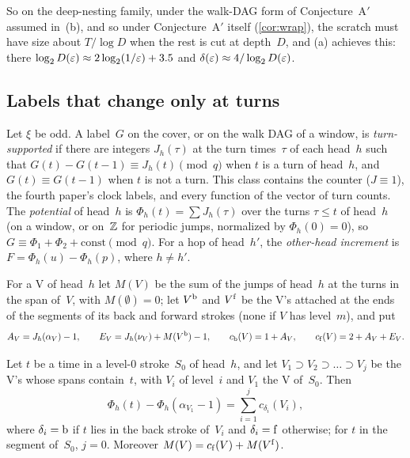 So on the deep-nesting family, under the walk-DAG form of Conjecture~A$'$ assumed in~(b), and so under Conjecture~A$'$
itself (\cref{cor:wrap}), the scratch must have size about
$T/\log D$ when the rest is cut at depth~$D$, and (a) achieves this: there $\log_2D(\varepsilon)\approx2\log_2(1/\varepsilon)+3.5$ and $\delta(\varepsilon)\approx4/\log_2D(\varepsilon)$.

\subsection{Labels that change only at turns}\label{sec:dnp-turnlabels}

Let $\xi$ be odd. A label~$G$ on the cover, or on the walk DAG of a window, is \emph{turn-supported} if there are integers
$J_h(\tau)$ at the turn times~$\tau$ of each head~$h$ such that $G(t)-G(t-1)\equiv J_h(t)\pmod q$ when $t$ is a turn of
head~$h$, and $G(t)\equiv G(t-1)$ when $t$ is not a turn. This class contains the counter ($J\equiv1$), the fourth paper's
clock labels, and every function of the vector of turn counts. The \emph{potential} of head~$h$ is
$\Phi_h(t)=\sum J_h(\tau)$ over the turns $\tau\le t$ of head~$h$ (on a window, or on~$\mathbb{Z}$ for periodic jumps, normalized
by $\Phi_h(0)=0$), so $G\equiv\Phi_1+\Phi_2+\mathrm{const}\pmod q$. For a hop of head~$h'$, the \emph{other-head
increment} is $F=\Phi_h(u)-\Phi_h(p)$, where $h\ne h'$.

For a V of head~$h$ let $M(V)$ be the sum of the jumps of head~$h$ at the turns in the span of~$V$, with $M(\emptyset)=0$;
let $V^{\mathrm{b}}$ and $V^{\mathrm{f}}$ be the V's attached at the ends of the segments of its back and forward strokes (none if $V$ has
level~$m$), and put
\[
  A_V=J_h(\alpha_V)-1,\qquad E_V=J_h(\nu_V)+M(V^{\mathrm{b}})-1,\qquad c_{\mathrm{b}}(V)=1+A_V,\qquad c_{\mathrm{f}}(V)=2+A_V+E_V .
\]

\begin{lemma}\label{lem:pathsums}
\notformalized
Let $t$ be a time in a level-$0$ stroke~$S_0$ of head~$h$, and let $V_1\supset V_2\supset\dots\supset V_j$ be the V's whose
spans contain~$t$, with $V_i$ of level~$i$ and $V_1$ the V of~$S_0$. Then
\[
  \Phi_h(t)-\Phi_h(\alpha_{V_1}-1)=\sum_{i=1}^jc_{\delta_i}(V_i),
\]
where $\delta_i=\mathrm{b}$ if $t$ lies in the back stroke of~$V_i$ and $\delta_i=\mathrm{f}$ otherwise; for $t$ in the segment of~$S_0$,
$j=0$. Moreover $M(V)=c_{\mathrm{f}}(V)+M(V^{\mathrm{f}})$.
\end{lemma}

